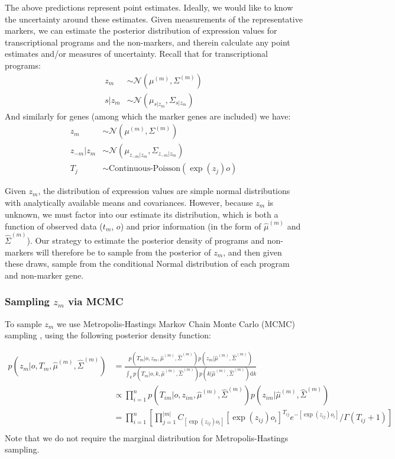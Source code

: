 \documentclass[10pt]{article}
\begin{document}
The above predictions represent point estimates. Ideally, we would like to know the uncertainty around these estimates. Given measurements of the representative markers, we can estimate the posterior distribution of expression values for transcriptional programs and the non-markers, and therein calculate any point estimates and/or measures of uncertainty. Recall that for transcriptional programs: 
\begin{align*}
z_m & \sim \mathcal{N}\left(\mu^{(m)}, \Sigma^{(m)} \right) \\
s|z_m & \sim \mathcal{N}(\mu_{s|z_m}, \Sigma_{s|z_m}) 
\end{align*}
And similarly for genes (among which the marker genes are included) we have: 
\begin{align*}
z_m & \sim \mathcal{N}(\mu^{(m)}, \Sigma^{(m)}) \\
z_{-m}|z_m & \sim \mathcal{N}(\mu_{z_{-m}|z_m}, \Sigma_{z_{-m}|z_m}) \\
T_j & \sim \textrm{Continuous-Poisson}(\exp(z_j)o)
\end{align*}

Given $z_m$, the distribution of expression values are simple normal distributions with analytically available means and covariances. However, because $z_m$ is unknown, we must factor into our estimate its distribution, which is both a function of observed data ($t_m$, $o$) and prior information (in the form of $\hat{\mu}^{(m)}$ and $\hat{\Sigma}^{(m)}$). Our strategy  to estimate the posterior density of programs and non-markers will therefore be to sample from the posterior of $z_m$, and then given these draws, sample from the conditional Normal distribution of each program and non-marker gene.

\subsubsection{Sampling $z_m$ via MCMC} 

To sample $z_m$ we use Metropolis-Hastings Markov Chain Monte Carlo (MCMC) sampling \cite{Gelman2013}, using the following posterior density function:

\begin{align*}
p(z_m| o, T_m, \hat{\mu}^{(m)}, \hat{\Sigma}^{(m)}) & =  \frac{p(T_m | o, z_m, \hat{\mu}^{(m)}, \hat{\Sigma}^{(m)}) p(z_m| \hat{\mu}^{(m)}, \hat{\Sigma}^{(m)}) }{ \int_k  p(T_m | o, k, \hat{\mu}^{(m)}, \hat{\Sigma}^{(m)}) p(k | \hat{\mu}^{(m)}, \hat{\Sigma}^{(m)}) \textrm{d}k } \\
& \propto \prod_{i=1}^{n}  p(T_{im} | o, z_{im}, \hat{\mu}^{(m)}, \hat{\Sigma}^{(m)}) p(z_{im}| \hat{\mu}^{(m)}, \hat{\Sigma}^{(m)}) \\
& = \prod_{i=1}^{n} \left[ \prod_{j=1}^{|m|} C_{[\exp(z_{ij})o_i]} [\exp(z_{ij})o_i]^{T_{ij}}  e^{-[\exp(z_{ij})o_i]} / \Gamma(T_{ij} + 1) \right] \\ 
\end{align*}
Note that we do not require the marginal distribution for Metropolis-Hastings sampling. 
\end{document}
